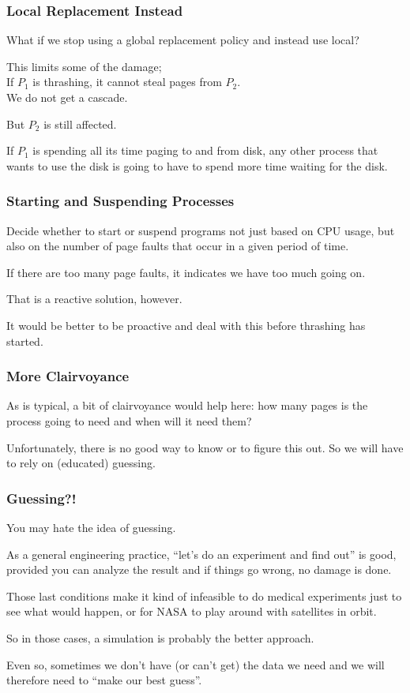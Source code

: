 \begin{frame}
\frametitle{Local Replacement Instead}

What if we stop using a global replacement policy and instead use local? 

This limits some of the damage;\\
\quad If $P_{1}$ is thrashing, it cannot steal pages from $P_{2}$.\\
\quad We do not get a cascade.

But $P_{2}$ is still affected.

If $P_{1}$ is spending all its time paging to and from disk, any other process that wants to use the disk is going to have to spend more time waiting for the disk.


\end{frame}

\begin{frame}
\frametitle{Starting and Suspending Processes}

Decide whether to start or suspend programs not just based on CPU usage, but also on the number of page faults that occur in a given period of time. 

If there are too many page faults, it indicates we have too much going on. 

That is a reactive solution, however. 

It would be better to be proactive and deal with this before thrashing has started.


\end{frame}

\begin{frame}
\frametitle{More Clairvoyance}

As is typical, a bit of clairvoyance would help here: how many pages is the process going to need and when will it need them? 

Unfortunately, there is no good way to know or to figure this out. So we will have to rely on (educated) guessing.

\end{frame}

\begin{frame}
\frametitle{Guessing?!}

You may hate the idea of guessing. 

As a general engineering practice, ``let's do an experiment and find out'' is good, provided you can analyze the result and if things go wrong, no damage is done. 

Those last conditions make it kind of infeasible to do medical experiments just to see what would happen, or for NASA to play around with satellites in orbit. 

So in those cases, a simulation is probably the better approach. 

Even so, sometimes we don't have (or can't get) the data we need and we will therefore need to ``make our best guess''.


\end{frame}

